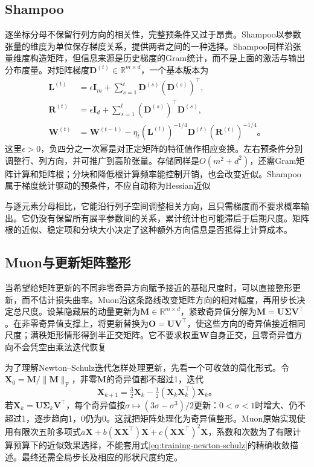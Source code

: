 \subsection{Shampoo}
\label{sec:training-shampoo}

逐坐标分母不保留行列方向的相关性，完整预条件又过于昂贵。Shampoo以参数张量的维度为单位保存梯度关系，提供两者之间的一种选择。Shampoo同样沿张量维度构造矩阵，但信息来源是历史梯度的Gram统计，而不是上面的激活与输出分布度量。对矩阵梯度$\bm D^{(t)}\in\mathbb R^{m\times d}$，一个基本版本为
\begin{align}
  \bm L^{(t)}&=\epsilon\bm I_m+\sum_{s=1}^t\bm D^{(s)}(\bm D^{(s)})^{\top},\\
  \bm R^{(t)}&=\epsilon\bm I_d+\sum_{s=1}^t(\bm D^{(s)})^{\top}\bm D^{(s)},\\
  \bm W^{(t)}&=\bm W^{(t-1)}-
    \eta_t(\bm L^{(t)})^{-1/4}\bm D^{(t)}(\bm R^{(t)})^{-1/4}\text{。}
  \label{eq:training-shampoo}
\end{align}
这里$\epsilon>0$，负四分之一次幂是对正定矩阵的特征值作相应变换。左右预条件分别调整行、列方向，并可推广到高阶张量。存储同样是$O(m^2+d^2)$，还需Gram矩阵计算和矩阵根；分块和降低根计算频率能控制开销，也会改变近似。Shampoo属于梯度统计驱动的预条件，不应自动称为Hessian近似

与逐元素分母相比，它能沿行列子空间调整相关方向，且只需梯度而不要求概率输出。它仍没有保留所有展平参数间的关系，累计统计也可能滞后于后期尺度。矩阵根的近似、稳定项和分块大小决定了这种额外方向信息是否抵得上计算成本。

\subsection{Muon与更新矩阵整形}
\label{sec:training-muon}

当希望给矩阵更新的不同非零奇异方向赋予接近的基础尺度时，可以直接整形更新，而不估计损失曲率。Muon沿这条路线改变矩阵方向的相对幅度，再用步长决定总尺度。设某隐藏层的动量更新为$\bm M\in\mathbb R^{m\times d}$，紧致奇异值分解为$\bm M=\bm U\bm\Sigma\bm V^{\top}$。在非零奇异值支撑上，将更新替换为$\bm O=\bm U\bm V^{\top}$，使这些方向的奇异值接近相同尺度；满秩矩形情形得到半正交矩阵。它不要求权重$\bm W$自身正交，且零奇异值方向不会凭空由乘法迭代恢复

为了理解Newton--Schulz迭代怎样处理更新，先看一个可收敛的简化形式。令$\bm X_0=\bm M/\lVert\bm M\rVert_{\mathrm F}$，非零$\bm M$的奇异值都不超过1，迭代
\begin{equation}
  \bm X_{k+1}=\tfrac32\bm X_k-
             \tfrac12(\bm X_k\bm X_k^{\top})\bm X_k\text{。}
  \label{eq:training-newton-schulz}
\end{equation}
若$\bm X_k=\bm U\bm\Sigma_k\bm V^{\top}$，每个奇异值按$\sigma\mapsto(3\sigma-\sigma^3)/2$更新：$0<\sigma<1$时增大、仍不超过1，逐步趋向1，0仍为0。这就把矩阵处理化为奇异值整形。Muon原始实现使用有限次五阶多项式$a\bm X+b(\bm X\bm X^{\top})\bm X+c(\bm X\bm X^{\top})^2\bm X$，系数和次数为了有限计算预算下的近似效果选择，不能套用式\eqref{eq:training-newton-schulz}的精确收敛描述。最终还需全局步长及相应的形状尺度约定。

